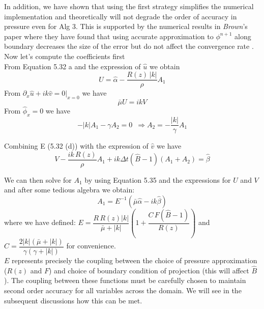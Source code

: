 In addition, we have shown that using the first strategy simplifies the numerical implementation and theoretically will not degrade the order of accuracy in pressure even for Alg 3. This is supported by the numerical results in \emph{Brown}'s paper where they have found that using accurate approximation to $\phi^{n+1}$ along boundary decreases the size of the error but do not affect the convergence rate \cite{brown2001accurate}.\\

Now let's compute the coefficients first\\
From Equation 5.32 a and the expression of $\hat{u}$ we obtain
\begin{equation}
U = \hat{\alpha} - \dfrac{R(z) \, |k|}{\rho} A_1
\end{equation}
From $\partial_x \hat{u} + ik \hat{v} = 0 |_{x = 0}$ we have
\begin{equation}
\bar{\mu} U = ik V
\end{equation}
From $\hat{\phi}_x = 0$  we have
\begin{equation}
-|k| A_1 - \gamma A_2 = 0 \, \, \, \Rightarrow A_2 = - \dfrac{|k|}{\gamma} A_1
\end{equation}

Combining E (5.32 (d)) with the expression of $\hat{v}$ we have
\begin{equation*}
V - \dfrac{ik \, R(z)}{\rho} A_1 + ik \Delta t (\hat{B} - 1) (A_1 + A_2) = \hat{\beta}
\end{equation*}

We can then solve for $A_1$ by using Equation 5.35 and the expressions for $U$ and $V$ and after some tedious algebra we obtain:
\begin{equation}
A_1 = E^{-1} (\bar{\mu} \hat{\alpha} - ik \hat{\beta})
\end{equation}
where we have defined: $E =  \dfrac{R \, R(z) |k|}{\bar{\mu} + |k|}(1 + \dfrac{C \, F(\hat{B} - 1)}{R(z)})$ and $C = \dfrac{2 |k|(\bar{\mu} + |k|)}{\gamma (\gamma + |k|)}$ for convenience.\\

$E$ represents precisely the coupling between the choice of pressure approximation ($R(z)$ and $F$) and choice of boundary condition of projection (this will affect $\hat{B}$). The coupling between these functions must be carefully chosen to maintain second order accuracy for all variables across the domain. We will see in the subsequent discussions how this can be met.\\

